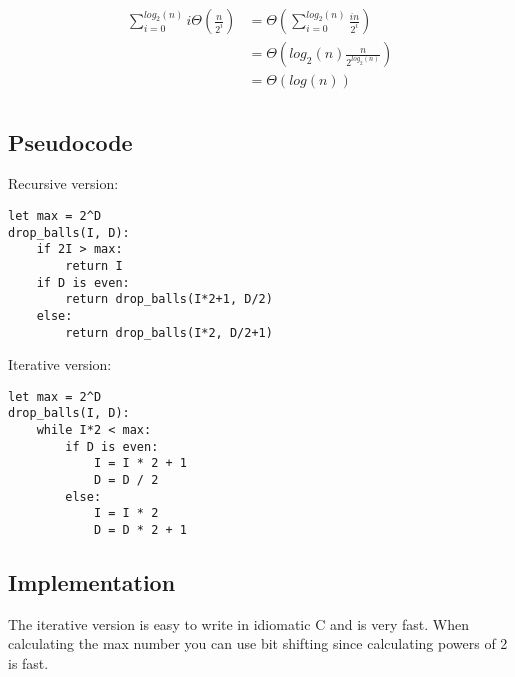 \documentclass[12pt,letterpaper]{article}
\begin{document}
\begin{align}
\sum_{i = 0}^{log_2(n)} i \Theta(\frac{n}{2^i}) &= \Theta(\sum_{i = 0}^{log_2(n)}\frac{in}{2^i})\\
    &= \Theta(log_2(n)\frac{n}{2^{log_2(n)}})\\
    &= \Theta(log(n))\\
\end{align}



\subsection{Pseudocode}
Recursive version:
\begin{verbatim}
let max = 2^D
drop_balls(I, D):
    if 2I > max:
        return I
    if D is even:
        return drop_balls(I*2+1, D/2)
    else:
        return drop_balls(I*2, D/2+1)
\end{verbatim}

Iterative version:
\begin{verbatim}
let max = 2^D
drop_balls(I, D):
    while I*2 < max:
        if D is even:
            I = I * 2 + 1
            D = D / 2
        else:
            I = I * 2
            D = D * 2 + 1
\end{verbatim}


\subsection{Implementation}
The iterative version is easy to write in idiomatic C and is very fast. When
calculating the max number you can use bit shifting since calculating powers of
2 is fast.
\end{document}
